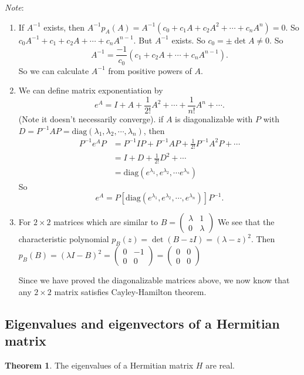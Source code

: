 \documentclass[a4paper]{article}
\theoremstyle{definition}
\newtheorem*{thm}{Theorem}
\newcommand{\note}{\noindent \emph{Note}:\;}
\begin{document}
\note
\begin{enumerate}
\item If $A^{-1}$ exists, then $A^{-1} p_A(A) = A^{-1}(c_0 + c_1A + c_2A^2 + \cdots + c_n A^n) = 0$. So $c_0 A^{-1} + c_1 + c_2A + \cdots + c_n A^{n - 1}$. But $A^{-1}$ exists. So $c_0 = \pm \det A \not= 0$. So
\[
A^{-1} = \frac{-1}{c_0}(c_1 + c_2 A + \cdots + c_n A^{n -1}).
\]
So we can calculate $A^{-1}$ from positive powers of $A$.
\item We can define matrix exponentiation by
  \[
  e^A = I + A + \frac{1}{2!}A^2 + \cdots + \frac{1}{n!}A^n + \cdots.
  \]
  (Note it doesn't necessarily converge).
  if $A$ is diagonalizable with $P$ with $D = P^{-1}AP = \mathrm{diag}(\lambda_1, \lambda_2, \cdots, \lambda_n)$, then
  \begin{align*}
    P^{-1}e^A P &= P^{-1}IP + P^{-1}AP + \frac{1}{2!}P^{-1}A^2P + \cdots\\
    &= I + D + \frac{1}{2!}D^{2} + \cdots\\
    &= \mathrm{diag}(e^{\lambda_1}, e^{\lambda_2}, \cdots e^{\lambda_n})
  \end{align*}
  So
  \[
  e^A = P[\mathrm{diag}(e^{\lambda_1}, e^{\lambda_2}, \cdots, e^{\lambda_n})]P^{-1}.
  \]
\item For $2\times 2$ matrices which are similar to $B = 
  \begin{pmatrix}
    \lambda & 1\\
    0 & \lambda
  \end{pmatrix}$
  We see that the characteristic polynomial $p_B(z) = \det (B - zI) = (\lambda - z)^2$. Then $p_B(B) = (\lambda I - B)^2 = 
  \begin{pmatrix}
    0 & -1\\
    0 & 0
  \end{pmatrix} = 
  \begin{pmatrix}
    0 & 0\\
    0 & 0
  \end{pmatrix}$

  Since we have proved the diagonalizable matrices above, we now know that any $2\times 2$ matrix satisfies Cayley-Hamilton theorem. 
\end{enumerate}

\subsection{Eigenvalues and eigenvectors of a Hermitian matrix}
\begin{thm}
  The eigenvalues of a Hermitian matrix $H$ are real.
\end{thm}
\end{document}
